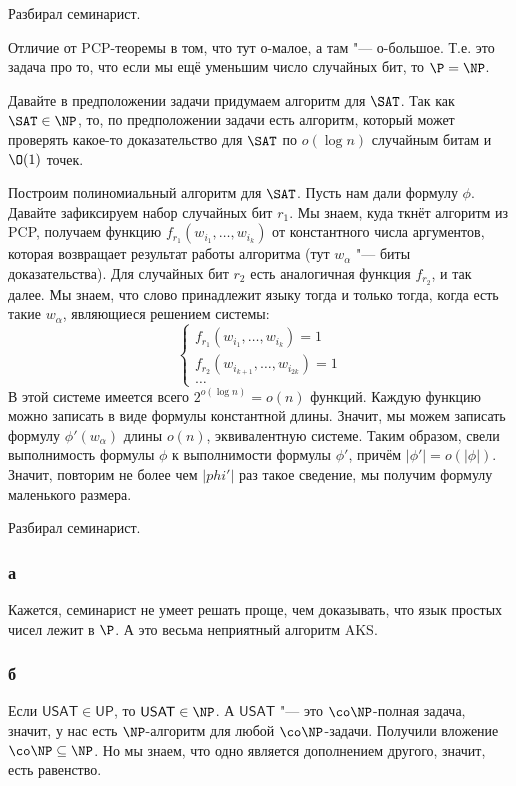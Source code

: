 	Разбирал семинарист.

	Отличие от PCP-теоремы в том, что тут о-малое, а там "--- о-большое.
	Т.е. это задача про то, что если мы ещё уменьшим число случайных бит, то $\P=\NP$.

	Давайте в предположении задачи придумаем алгоритм для $\SAT$.
	Так как $\SAT \in \NP$, то, по предположении задачи есть алгоритм, который
	может проверять какое-то доказательство для $\SAT$ по $o(\log n)$ случайным битам и $\O(1)$ точек.

	Построим полиномиальный алгоритм для $\SAT$.
	Пусть нам дали формулу $\phi$.
	Давайте зафиксируем набор случайных бит $r_1$.
	Мы знаем, куда ткнёт алгоритм из PCP, получаем функцию $f_{r_1}(w_{i_1}, \dots, w_{i_k})$ от константного
	числа аргументов, которая возвращает результат работы алгоритма (тут $w_{\alpha}$ "--- биты доказательства).
	Для случайных бит $r_2$ есть аналогичная функция $f_{r_2}$, и так далее.
	Мы знаем, что слово принадлежит языку тогда и только тогда, когда есть такие $w_{\alpha}$, являющиеся решением системы:
	\[
		\begin{cases}
			f_{r_1}(w_{i_1}, \dots, w_{i_k}) = 1 \\
			f_{r_2}(w_{i_{k+1}}, \dots, w_{i_{2k}}) = 1 \\
			\dots
		\end{cases}
	\]
	В этой системе имеется всего $2^{o(\log n)}=o(n)$ функций.
	Каждую функцию можно записать в виде формулы константной длины.
	Значит, мы можем записать формулу $\phi'(w_{\alpha})$ длины $o(n)$, эквивалентную системе.
	Таким образом, свели выполнимость формулы $\phi$ к выполнимости формулы $\phi'$, причём $|\phi'|=o(|\phi|)$.
	Значит, повторим не более чем $|phi'|$ раз такое сведение, мы получим формулу маленького размера.

	Разбирал семинарист.
	\subsubsection{а}
		Кажется, семинарист не умеет решать проще, чем доказывать, что язык простых чисел лежит в $\P$.
		А это весьма неприятный алгоритм AKS.

	\subsubsection{б}
		Если $\mathsf{USAT} \in \mathsf{UP}$, то $\mathsf{USAT} \in \NP$.
		А $\mathsf{USAT}$ "--- это $\co\NP$-полная задача, значит, у нас есть $\NP$-алгоритм для любой $\co\NP$-задачи.
		Получили вложение $\co\NP \subseteq \NP$.
		Но мы знаем, что одно является дополнением другого, значит, есть равенство.

